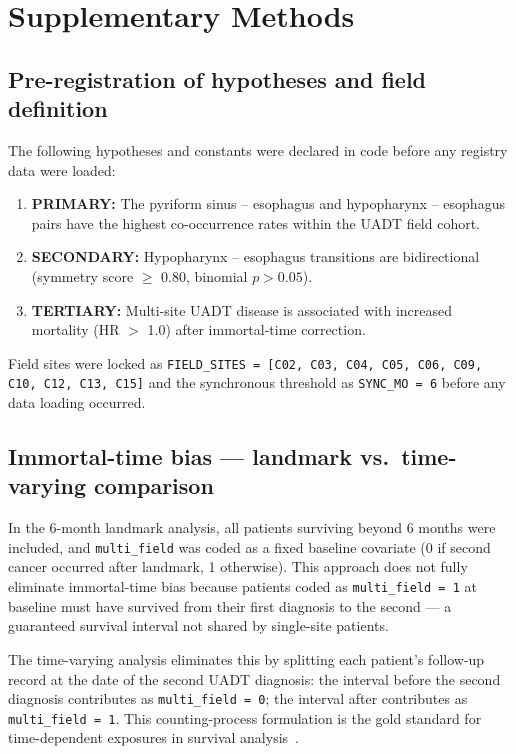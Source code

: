 \documentclass[12pt,a4paper]{article}
\begin{document}
\newpage
\section*{Supplementary Methods}

\subsection*{Pre-registration of hypotheses and field definition}

The following hypotheses and constants were declared in code before any
registry data were loaded:

\begin{enumerate}
  \item \textbf{PRIMARY:} The pyriform sinus -- esophagus and
    hypopharynx -- esophagus pairs have the highest co-occurrence rates
    within the UADT field cohort.
  \item \textbf{SECONDARY:} Hypopharynx -- esophagus transitions are
    bidirectional (symmetry score $\geq$ 0.80, binomial $p > 0.05$).
  \item \textbf{TERTIARY:} Multi-site UADT disease is associated with
    increased mortality (HR $>$ 1.0) after immortal-time correction.
\end{enumerate}

Field sites were locked as \texttt{FIELD\_SITES = [C02, C03, C04, C05, C06,
C09, C10, C12, C13, C15]} and the synchronous threshold as
\texttt{SYNC\_MO = 6} before any data loading occurred.

\subsection*{Immortal-time bias — landmark vs.\ time-varying comparison}

In the 6-month landmark analysis, all patients surviving beyond 6 months
were included, and \texttt{multi\_field} was coded as a fixed baseline
covariate (0 if second cancer occurred after landmark, 1 otherwise).
This approach does not fully eliminate immortal-time bias because patients
coded as \texttt{multi\_field\,=\,1} at baseline must have survived from their
first diagnosis to the second — a guaranteed survival interval not shared by
single-site patients.

The time-varying analysis eliminates this by splitting each patient's
follow-up record at the date of the second UADT diagnosis:
the interval before the second diagnosis contributes as
\texttt{multi\_field\,=\,0}; the interval after contributes as
\texttt{multi\_field\,=\,1}.
This counting-process formulation is the gold standard for time-dependent
exposures in survival analysis~\citep{suissa2008,therneau2013}.

\newpage


\end{document}
